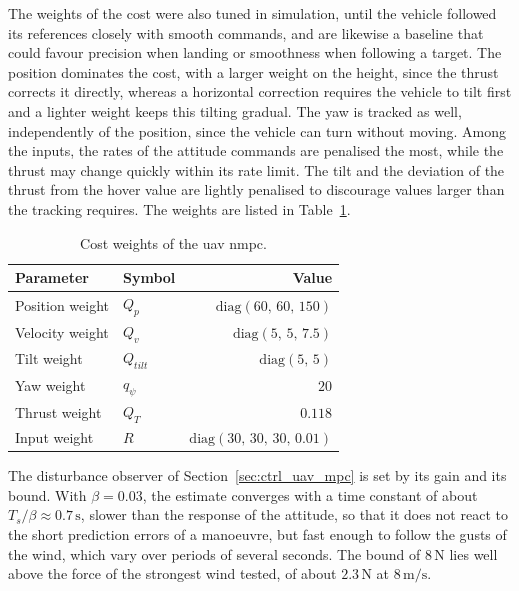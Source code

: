 The weights of the cost were also tuned in simulation, until the vehicle followed its references closely with smooth commands, and are likewise a baseline that could favour precision when landing or smoothness when following a target. The position dominates the cost, with a larger weight on the height, since the thrust corrects it directly, whereas a horizontal correction requires the vehicle to tilt first and a lighter weight keeps this tilting gradual. The yaw is tracked as well, independently of the position, since the vehicle can turn without moving. Among the inputs, the rates of the attitude commands are penalised the most, while the thrust may change quickly within its rate limit. The tilt and the deviation of the thrust from the hover value are lightly penalised to discourage values larger than the tracking requires. The weights are listed in Table~\ref{tab:uav_ctrl_weights}.

\begin{table}[htbp]
    \centering
    \caption{Cost weights of the \gls{uav} \gls{nmpc}.}
    \label{tab:uav_ctrl_weights}
    \begin{tabular*}{0.75\linewidth}{@{\extracolsep{\fill}}llr}
        \toprule
        \textbf{Parameter} & \textbf{Symbol} & \textbf{Value} \\
        \midrule
        Position weight & $Q_p$ & $\mathrm{diag}(60,\,60,\,150)$ \\
        Velocity weight & $Q_v$ & $\mathrm{diag}(5,\,5,\,7.5)$ \\
        Tilt weight & $Q_{tilt}$ & $\mathrm{diag}(5,\,5)$ \\
        Yaw weight & $q_\psi$ & $20$ \\
        Thrust weight & $Q_T$ & $0.118$ \\
        Input weight & $R$ & $\mathrm{diag}(30,\,30,\,30,\,0.01)$ \\
        \bottomrule
    \end{tabular*}
\end{table}

The disturbance observer of Section~\ref{sec:ctrl_uav_mpc} is set by its gain and its bound. With $\beta = 0.03$, the estimate converges with a time constant of about $T_s/\beta \approx 0.7\,\text{s}$, slower than the response of the attitude, so that it does not react to the short prediction errors of a manoeuvre, but fast enough to follow the gusts of the wind, which vary over periods of several seconds. The bound of $8\,\text{N}$ lies well above the force of the strongest wind tested, of about $2.3\,\text{N}$ at $8\,\text{m/s}$.

